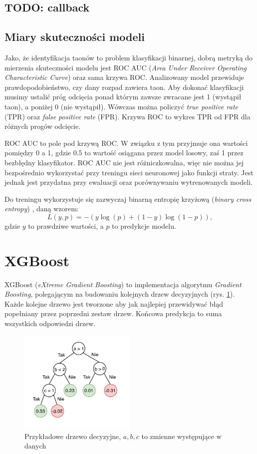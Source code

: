 \documentclass{pracalicmgr}
\begin{document}
	\subsection{TODO: callback}
	
	\subsection{Miary skuteczności modeli}
	Jako, że identyfikacja taonów to problem klasyfikacji binarnej, dobrą metryką do mierzenia skuteczności modelu jest ROC AUC (\textit{Area Under Receiver Operating Characteristic Curve}) oraz sama krzywa ROC. Analizowany model przewiduje prawdopodobieństwo, czy dany rozpad zawiera taon. Aby dokonać klasyfikacji musimy ustalić próg odcięcia ponad którym zawsze zwracane jest 1 (wystąpił taon), a poniżej 0 (nie wystąpił). Wówczas można policzyć \textit{true positive rate} (TPR) oraz \textit{false positive rate} (FPR). Krzywa ROC to wykres TPR od FPR dla różnych progów odcięcie.
	
	ROC AUC to pole pod krzywą ROC. W związku z tym przyjmuje ona wartości pomiędzy 0 a 1, gdzie 0.5 to wartość osiągana przez model losowy, zaś 1 przez bezbłędny klasyfikator. ROC AUC nie jest różniczkowalna, więc nie można jej bezpośrednio wykorzystać przy treningu sieci neuronowej jako funkcji straty. Jest jednak jest przydatna przy ewaluacji oraz porównywaniu wytrenowanych modeli.
	
	Do treningu wykorzystuje się zazwyczaj binarną entropię krzyżową (\textit{binary cross entropy}) \cite{dl}, daną wzorem: $$ L(y, p) = -(y\log(p)+(1-y)\log(1-p)),$$ gdzie $y$ to prawdziwe wartości, a $p$ to predykcje modelu.
	
	\section{XGBoost}
	XGBoost (\textit{eXtreme Gradient Boosting}) \cite{xgboost} to implementacja algorytmu \textit{Gradient Boosting}, polegającym na budowaniu kolejnych drzew decyzyjnych (rys. \ref{fig:tree}). Każde kolejne drzewo jest tworzone aby jak najlepiej przewidywać błąd popełniany przez poprzedni zestaw drzew. Końcowa predykcja to suma wszystkich odpowiedzi drzew.
	
	\begin{figure}[h]
	\centering
	\includegraphics[width=0.5\textwidth]{tree.pdf}
	\caption{Przykładowe drzewo decyzyjne, $a, b, c$ to zmienne występujące w danych}
	\label{fig:tree}
	\end{figure}
	
\end{document}

